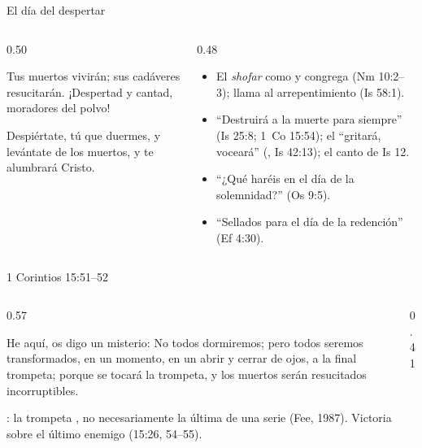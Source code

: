 \begin{frame}{El día del despertar}
\begin{columns}[t,onlytextwidth]
\begin{column}{0.50\textwidth}
\begin{cita}Tus muertos vivirán; sus cadáveres resucitarán. ¡Despertad y cantad, moradores del polvo!\end{cita}
\begin{cita}Despiértate, tú que duermes, y levántate de los muertos, y te alumbrará Cristo.\end{cita}
\end{column}
\begin{column}{0.48\textwidth}\scriptsize\RaggedRight
\begin{itemize}
\item El \emph{shofar} como  y congrega (Nm 10:2--3); llama al arrepentimiento (Is 58:1).
\item ``Destruirá a la muerte para siempre'' (Is 25:8; 1~Co 15:54); el \SENOR{} ``gritará, voceará'' (, Is 42:13); el canto de Is 12.
\item ``¿Qué haréis en el día de la solemnidad?'' (Os 9:5).
\item ``Sellados para el día de la redención'' (Ef 4:30).
\end{itemize}
\end{column}
\end{columns}
\end{frame}

\begin{frame}{1 Corintios 15:51--52}
\begin{columns}[c,onlytextwidth]
\begin{column}{0.57\textwidth}
\begin{cita}He aquí, os digo un misterio: No todos dormiremos; pero todos seremos transformados, en un momento, en un abrir y cerrar de ojos, a la final trompeta; porque se tocará la trompeta, y los muertos serán resucitados incorruptibles.\end{cita}
\scriptsize\RaggedRight {}: la trompeta , no necesariamente la última de una serie (Fee, 1987). Victoria sobre el último enemigo (15:26, 54--55).
\end{column}
\begin{column}{0.41\textwidth}\end{column}
\end{columns}
\end{frame}

